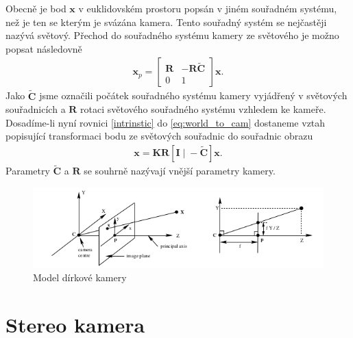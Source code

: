 \documentclass[twoside]{ctuthesis}
\newcommand{\tl}[1]{$\mathbf{#1}$}
\begin{document}
Obecně je bod $\mathbf{x}$ v euklidovském prostoru popsán v jiném souřadném systému, než je ten se kterým je svázána kamera. Tento souřadný systém se nejčastěji nazývá světový. Přechod do souřadného systému kamery ze světového je možno popsat následovně 
\begin{align} 
    \mathbf{x}_p = \begin{bmatrix} \mathbf{R} & -\mathbf{R\tilde C} \\ 0 & 1 \end{bmatrix}
    \mathbf{x}.
    \label{eq:world_to_cam}
\end{align}
Jako $\tilde{\mathbf{C}}$ jsme označili počátek souřadného systému kamery vyjádřený v světových souřadnicích a \tl{R} rotaci světového souřadného systému vzhledem ke kameře. Dosadíme-li nyní rovnici \ref{intrinstic} do \ref{eq:world_to_cam} dostaneme vztah popisující transformaci bodu ze světových souřadnic do souřadnic obrazu
\begin{align}
    \mathbf{x} = \mathbf{KR}[\mathbf{I} \; | \; - \mathbf{\tilde C} ]\mathbf{x}.
    \label{eq:world_to_img}
\end{align}
Parametry $\mathbf{\tilde C}$ a \tl{R} se souhrně nazývají vnější parametry kamery. 
\begin{figure}
    \centering
    \includegraphics[width = 0.8\linewidth]{pictures/dirkovymodel_nakres.png}
    \caption{Model dírkové kamery}
    \label{pinhole}
\end{figure}

\section{Stereo kamera}
\end{document}
